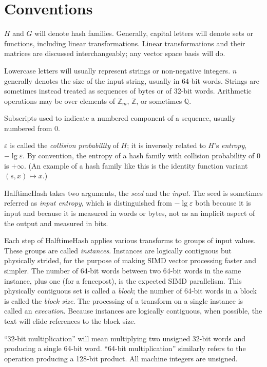 \documentclass[acmsmall, nonacm]{acmart}
\newcommand{\rats}{\mathbb{Q}}
\newcommand{\ints}{\mathbb{Z}}
\begin{document}
\section{Conventions}

$H$ and $G$ will denote hash families.
Generally, capital letters will denote sets or functions, including linear transformations.
Linear transformations and their matrices are discussed interchangeably; any vector space basis will do.

Lowercase letters will usually represent strings or non-negative integers.
$n$ generally denotes the size of the input string, usually in 64-bit words.
Strings are sometimes instead treated as sequences of bytes or of 32-bit words.
Arithmetic operations may be over elements of $\ints_m$, $\ints$, or sometimes $\rats$.

Subscripts used to indicate a numbered component of a sequence, usually numbered from 0.

$\varepsilon$ is called the {\em collision probability} of $H$; it is inversely related to $H$'s {\em entropy}, $-\lg \varepsilon$.
By convention, the entropy of a hash family with collision probability of $0$ is $+\infty$.
(An example of a hash family like this is the identity function variant $(s, x) \mapsto x$.)

HalftimeHash takes two arguments, the {\em seed} and the {\em input}.
The seed is sometimes referred as {\em input entropy}, which is distinguished from $-\lg \varepsilon$ both because it is input and because it is measured in words or bytes, not as an implicit aspect of the output and measured in bits.

Each step of HalftimeHash applies various transforms to groups of input values.
These groups are called {\em instances}.
Instances are logically contiguous but physically strided, for the purpose of making SIMD vector processing faster and simpler.
The number of 64-bit words between two 64-bit words in the same instance, plus one (for a fencepost), is the expected SIMD parallelism.
This physically contiguous set is called a {\em block}; the number of 64-bit words in a block is called the {\em block size}.
The processing of a transform on a single instance is called an {\em execution}.
Because instances are logically contiguous, when possible, the text will elide references to the block size.

``32-bit multiplication'' will mean multiplying two unsigned 32-bit words and producing a single 64-bit word.
``64-bit multiplication'' similarly refers to the operation producing a 128-bit product.
All machine integers are unsigned.
\end{document}
